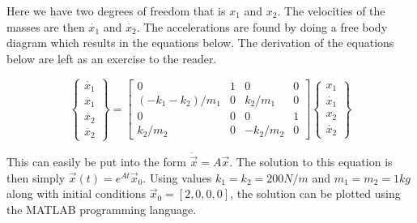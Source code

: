 \begin{enumerate}
   Here we have two degrees of freedom that is $x_1$ and $x_2$. The
   velocities of the masses are then $\dot{x_1}$ and $\dot{x_2}$. The
   accelerations are found by doing a free body diagram which results
   in the equations below. The derivation of the equations below are
   left as an exercise to the reader.

   \begin{equation}
     \begin{Bmatrix} \dot{x_1} \\ \ddot{x_1} \\ \dot{x_2}
       \\ \ddot{x_2} \end{Bmatrix}
     = \begin{bmatrix} 0 & 1 & 0 & 0 \\ (-k_1-k_2)/m_1 & 0 & k_2/m_1
       & 0 \\ 0 & 0 & 0 & 1 \\ k_2/m_2 & 0 & -k_2/m_2 & 0 \end{bmatrix} \begin{Bmatrix} x_1 \\ \dot{x_1} \\ x_2
       \\ \dot{x_2} \end{Bmatrix}
   \end{equation}

   This can easily be put into the form $\dot{\vec{x}} =
   A\vec{x}$. The solution to this equation is then simply $\vec{x}(t)
   = e^{At}\vec{x}_0$. Using values $k_1 = k_2 = 200 N/m$ and $m_1 =
   m_2 = 1 kg$ along with initial conditions $\vec{x}_0 = [2,0,0,0]$,
   the solution can be plotted using the MATLAB programming
   language. 
   

\end{enumerate}
